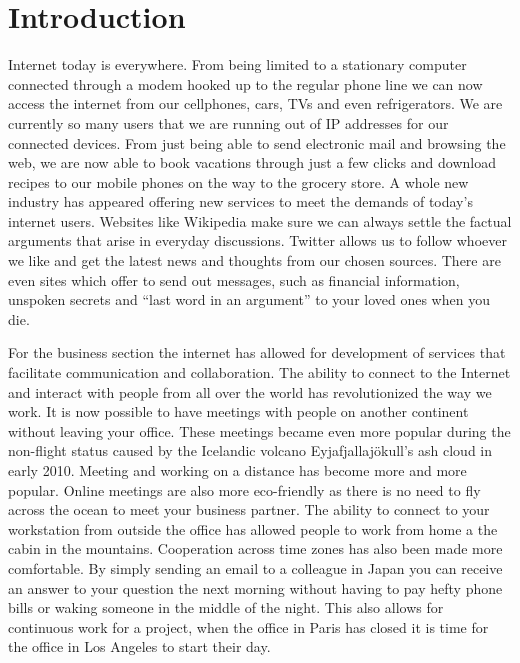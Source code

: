 \section {Introduction}
Internet today is everywhere. From being limited to a stationary computer connected through a modem hooked up to the regular phone line we can now access the internet from our cellphones, cars, TVs and even refrigerators. We are currently so many users that we are running out of IP addresses for our connected devices. From just being able to send electronic mail and browsing the web, we are now able to book vacations through just a few clicks and download recipes to our mobile phones on the way to the grocery store. A whole new industry has appeared offering new services to meet the demands of today's internet users. Websites like Wikipedia make sure we can always settle the factual arguments that arise in everyday discussions. Twitter allows us to follow whoever we like and get the latest news and thoughts from our chosen sources. There are even sites which offer to send out messages, such as financial information, unspoken secrets and “last word in an argument” to your loved ones when you die.

For the business section the internet has allowed for development of services that facilitate communication and collaboration. The ability to connect to the Internet and interact with people from all over the world has revolutionized the way we work. It is now possible to have meetings with people on another continent without leaving your office. These meetings became even more popular during the non-flight status caused by the Icelandic volcano Eyjafjallajökull's ash cloud in early 2010. Meeting and working on a distance has become more and more popular. Online meetings are also more eco-friendly as there is no need to fly across the ocean to meet your business partner. The ability to connect to your workstation from outside the office has allowed people to work from home a the cabin in the mountains. Cooperation across time zones has also been made more comfortable. By simply sending an email to a colleague in Japan you can receive an answer to your question the next morning without having to pay hefty phone bills or waking someone in the middle of the night. This also allows for continuous work for a project, when the office in Paris has closed it is time for the office in Los Angeles to start their day.

